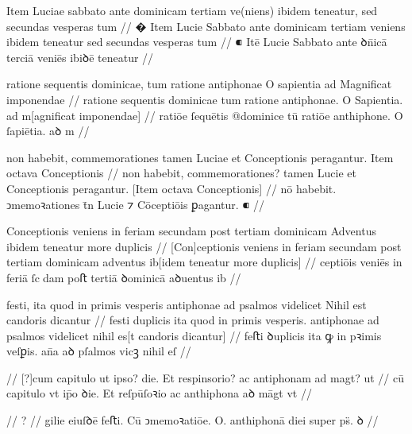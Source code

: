 \ex \bg
\gla
{}
{} Item Luciae sabbato ante dominicam tertiam ve(niens) ibidem
teneatur, sed secundas vesperas tum 
//
\glRekonstrukcja
{}
� Item Lucie Sabbato ante dominicam tertiam veniens ibidem
teneatur {sed secundas vesperas tum}
//
\glU
{}
⁌ Itē Lucie Sabbato ante ꝺn̄icā terciā veniēs ibiꝺē teneatur     
//
\endgl
\eg

\ex \bg
\gla
{}
ratione sequentis dominicae, tum
ratione antiphonae O sapientia ad Magnificat imponendae
//
\glRekonstrukcja
{}
ratione sequentis dominicae tum
ratione antiphonae. O Sapientia. ad m[agnificat imponendae]
//
\glU
{}
ratiōe ſequētis @dominice tū ratiōe anthiphone. O ſapiētia. aꝺ m 
//
\endgl
\eg



\ex \bg
\gla
{}
non habebit,
commemorationes tamen Luciae et Conceptionis peragantur.
Item octava Conceptionis
//
\glRekonstrukcja
{}
non habebit,
commemorationes? tamen Lucie et Conceptionis peragantur.
[Item octava Conceptionis]
//
\glU
{}
nō habebit. ↄmemoꝛationes t̄n Lucie ⁊ Cōceptiōis ꝑagantur. ⁌   
//
\endgl
\eg



\ex \bg
\gla
{}
Conceptionis veniens in feriam secundam post tertiam dominicam Adventus ibidem teneatur more duplicis
//
\glRekonstrukcja
{}
[Con]ceptionis veniens in feriam secundam post tertiam dominicam adventus ib[idem teneatur more duplicis]
//
\glU
{}
ceptiōis veniēs in feriā ſcdam poﬅ tertiā ꝺominicā aꝺuentus ib   
//
\endgl
\eg



\ex \bg
\gla
{}
festi, {} ita quod
in primis vesperis antiphonae ad psalmos videlicet Nihil est candoris
dicantur
//
\glRekonstrukcja
{}
festi duplicis ita quod
in primis vesperis. antiphonae ad psalmos videlicet nihil es[t candoris
dicantur]
//
\glU
{}
feﬅi ꝺuplicis ita ꝙ in pꝛimis veſꝑis. an̄a aꝺ pſalmos vicꝫ nihil eſ  
//
\endgl
\eg


\ex \bg
\gla
{}
{} {} {} {} {} {} {} {} {} {}
{} {} {} {} {} {} {} {} {} {}
//
\glRekonstrukcja
{}
[?]cum capitulo ut ipso? die. Et respinsorio? ac antiphonam ad magt? ut
//
\glU
{}
cū capitulo vt ip̄o ꝺie. Et reſpūſoꝛio ac anthiphona aꝺ māgt vt 
//
\endgl
\eg




\ex \bg
\gla
{}
{} {} {} {} {} {} {} {} {} {}
{} {} {} {} {} {} {} {} {} {}
//
\glRekonstrukcja
?
//
\glU
{}
gilie eiuſꝺē feﬅi. Cū ↄmemoꝛatiōe. O. anthiphonā diei super ps̈. ꝺ
//
\endgl
\eg



